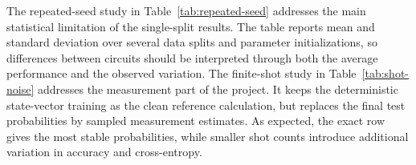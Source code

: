 The repeated-seed study in Table~\ref{tab:repeated-seed} addresses the main statistical limitation of the single-split results.  The table reports mean and standard deviation over several data splits and parameter initializations, so differences between circuits should be interpreted through both the average performance and the observed variation.  The finite-shot study in Table~\ref{tab:shot-noise} addresses the measurement part of the project.  It keeps the deterministic state-vector training as the clean reference calculation, but replaces the final test probabilities by sampled measurement estimates.  As expected, the exact row gives the most stable probabilities, while smaller shot counts introduce additional variation in accuracy and cross-entropy.
